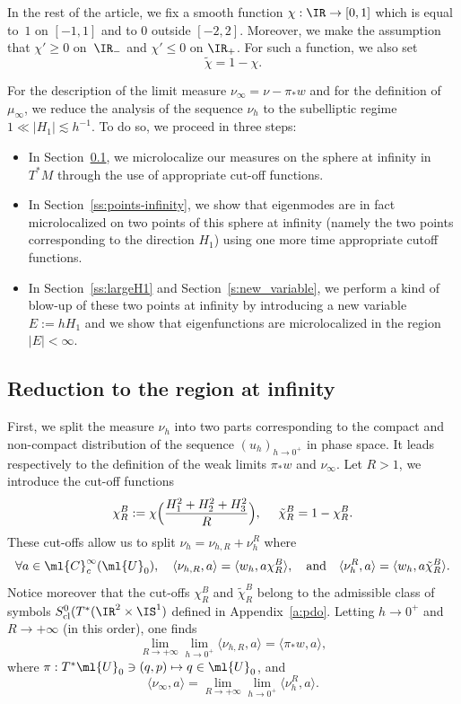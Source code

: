 \documentclass[10pt]{amsart}
\newcommand\mto{\mathchoice{\longmapsto}{\mapsto}{\mapsto}{\mapsto}}
\theoremstyle{plain}
\theoremstyle{definition}
\theoremstyle{remark}
\begin{document}
In the rest of the article, we fix a smooth function $\chi:\IR\to [0,1]$ which is equal to~$1$ on $[-1,1]$ and to $0$ outside $[-2,2]$. Moreover, we make the assumption that $\chi'\geq 0$ on~$\IR_-$ and $\chi'\leq 0$ on $\IR_+$. For such a function, we also set
\begin{equation}\label{e:partition-unity}
\tilde{\chi}=1-\chi.
\end{equation}

For the description of the limit measure $\nu_\infty = \nu - \pi_*w$ and for the definition of $\mu_\infty$, we reduce the analysis of the sequence $\nu_h$ to the subelliptic regime $1 \ll \vert H_1 \vert \lesssim h^{-1}$. To do so, we proceed in three steps:
\begin{itemize}
\item In Section~\ref{ss:sphere-infinity}, we microlocalize our measures on the sphere at infinity in $T^*M$ through the use of appropriate cut-off functions.
\item In Section~\ref{ss:points-infinity}, we show that eigenmodes are in fact microlocalized on two points of this sphere at infinity (namely the two points corresponding to the direction $H_1$) using one more time appropriate cutoff functions.
\item In Section~\ref{ss:largeH1} and Section~\ref{s:new_variable}, we perform a kind of blow-up of these two points at infinity by introducing a new variable $E:=hH_1$ and we show that eigenfunctions are microlocalized in the region $|E|<\infty$.
\end{itemize}

\subsection{Reduction to the region at infinity}\label{ss:sphere-infinity}

First, we split the measure $\nu_h$ into two parts corresponding to the compact and non-compact distribution of the sequence $(u_h)_{h\to 0^+}$ in phase space. It leads respectively to the definition of the weak limits $\pi_* w$ and $\nu_\infty$. Let $R>1$, we introduce the cut-off functions
\begin{equation}\label{e:cutoff-cone}
\chi_R^B:=\chi\Bigl(\frac{H_1^2+H_2^2+H_3^2}{R}\Bigr),\ \quad\tilde{\chi}_R^B=1-\chi_R^B.
\end{equation}
These cut-offs allow us to split $\nu_h=\nu_{h,R}+\nu_h^R$ where
\[
\forall a\in\ml{C}^\infty_c(\ml{U}_0),\quad\langle \nu_{h,R},a\rangle=\langle w_h, a\chi_R^B\rangle,\quad\text{and}\quad\langle \nu_{h}^R,a\rangle=\langle w_h, a\tilde{\chi}_R^B\rangle.
\]
Notice moreover that the cut-offs $\chi_R^B$ and $\tilde{\chi}_R^B$ belong to the admissible class of symbols $S^0_{\operatorname{cl}}(T^*(\IR^2\times\IS^1)$ defined in Appendix~\ref{a:pdo}. Letting $h\to 0^+$ and $R\to +\infty$ (in this order), one finds
\[
\lim_{R\to +\infty}\lim_{h\to 0^+}\langle \nu_{h,R},a\rangle= \langle\pi_* w,a\rangle,
\]
where $\pi: T^*\ml{U}_0 \ni (q,p) \mto q\in\ml{U}_0$, and
\begin{equation}%
\langle \nu_\infty,a\rangle = \lim_{R\to +\infty}\lim_{h\to 0^+}\langle \nu_{h}^R,a\rangle.
\end{equation}
\end{document}
